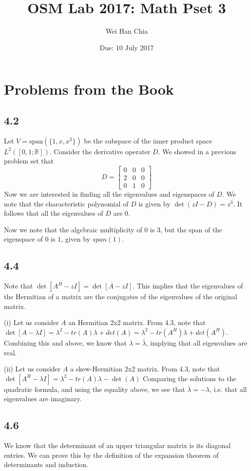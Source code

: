 \documentclass{article}
\begin{document}
	\title{OSM Lab 2017: Math Pset 3}
	\author{Wei Han Chia}
	\date{Due: 10 July 2017}
	\maketitle
	
	\section*{Problems from the Book}
	\subsection*{4.2}
	Let $V = \text{span}(\{ 1, x, x^2\})$ be the subspace of the inner product space $L^2([0,1;\mathbb{R}])$. Consider the derivative operater $D$. We showed in a previous problem set that 
	\[ D = \begin{bmatrix} 0 & 0 & 0 \\ 2 & 0 & 0 \\ 0 & 1 & 0 \end{bmatrix} \]
	Now we are interested in finding all the eigenvalues and eigenspaces of $D$. We note that the characteristic polynomial of $D$ is given by $\det(zI - D) = z^3$. It follows that all the eigenvalues of $D$ are 0.
	
	Now we note that the algebraic multiplicity of $0$ is 3, but the span of the eigenspace of 0 is $1$, given by $span({1})$. 
	
	\subsection*{4.4}
	Note that $\det[A^H - zI] = \overline{\det[A - {z}I]}$. This implies that the eigenvalues of the Hermitian of a matrix are the conjugates of the eigenvalues of the original matrix. 
	
	(i) Let us consider $A$ an Hermitian 2x2 matrix. From 4.3, note that $\det[A - \lambda I] = \lambda^2 - tr(A) \lambda + det(A) = \lambda^2 - tr(A^H) \lambda + det(A^H)$. Combining this and above, we know that $\lambda = \bar{\lambda}$, implying that all eigenvalues are real.
	
	(ii) Let us consider $A$ a skew-Hermitian 2x2 matrix. From 4.3, note that $\det[A^H - \lambda I ] = \lambda^2 - tr(A) \lambda - \det(A)$ Comparing the solutions to the quadratic formula, and using the equality above, we see that $\bar{\lambda} = - \lambda$, i.e. that all eigenvalues are imaginary.
	
	\subsection*{4.6}
	We know that the determinant of an upper triangular matrix is its diagonal entries. We can prove this by the definition of the expansion theorem of determinants and induction.
	
\end{document}
